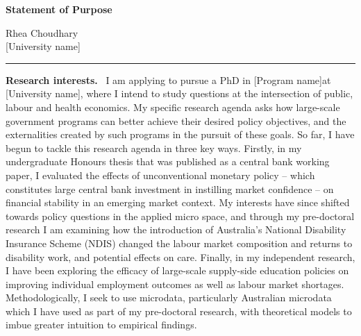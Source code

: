 \documentclass[11pt]{article}
\newcommand{\school}{[University name]}
\newcommand{\program}{[Program name]}
\newcommand{\shead}[1]{\par\vspace{0.85em}\noindent\textbf{#1.}\ }
\begin{document}
\noindent
\begin{minipage}[t]{0.60\textwidth}
  {\large\bfseries Statement of Purpose}
\end{minipage}\hfill
\begin{minipage}[t]{0.38\textwidth}
  \raggedleft
  Rhea Choudhary\\[2pt]
  \school
\end{minipage}

\vspace{0.5em}
\noindent\rule{\textwidth}{0.8pt}

\vspace{1.1em}

\shead{Research interests} I am applying to pursue a PhD in \program at \school, where I intend to study questions at the intersection of public, labour and health economics. My specific research agenda asks how large-scale government programs can better achieve their desired policy objectives, and the externalities created by such programs in the pursuit of these goals. So far, I have begun to tackle this research agenda in three key ways. Firstly, in my undergraduate Honours thesis that was published as a central bank working paper, I evaluated the effects of unconventional monetary policy -- which constitutes large central bank investment in instilling market confidence -- on financial stability in an emerging market context. My interests have since shifted towards policy questions in the applied micro space, and through my pre-doctoral research I am examining how the introduction of Australia's National Disability Insurance Scheme (NDIS) changed the labour market composition and returns to disability work, and potential effects on care. Finally, in my independent research, I have been exploring the efficacy of large-scale supply-side education policies on improving individual employment outcomes as well as labour market shortages. Methodologically, I seek to use microdata, particularly Australian microdata which I have used as part of my pre-doctoral research, with theoretical models to imbue greater intuition to empirical findings.
\end{document}
